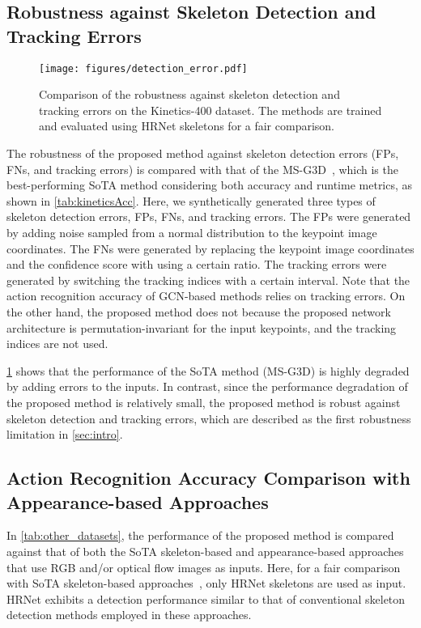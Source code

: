 \documentclass[10pt,twocolumn,letterpaper]{article}
\begin{document}
\subsection{Robustness against Skeleton Detection and Tracking Errors}
\begin{figure}[tb]
  \centering
  \texttt{[image: figures/detection\_error.pdf]}
  \caption{Comparison of the robustness against skeleton detection and tracking errors on the Kinetics-400 dataset. The methods are trained and evaluated using HRNet skeletons for a fair comparison.}
  \label{fig:detection_error}
\end{figure}

The robustness of the proposed method against skeleton detection errors (FPs, FNs, and tracking errors) is compared with that of the MS-G3D~\cite{Liu2020CVPR}, which is the best-performing SoTA method considering both accuracy and runtime metrics, as shown in \cref{tab:kineticsAcc}.
Here, we synthetically generated three types of skeleton detection errors, FPs, FNs, and tracking errors.
The FPs were generated by adding noise sampled from a normal distribution to the keypoint image coordinates.
The FNs were generated by replacing the keypoint image coordinates and the confidence score with  using a certain ratio.
The tracking errors were generated by switching the tracking indices with a certain interval.
Note that the action recognition accuracy of GCN-based methods relies on tracking errors.
On the other hand, the proposed method does not because the proposed network architecture is permutation-invariant for the input keypoints, and the tracking indices are not used.

\cref{fig:detection_error} shows that the performance of the SoTA method (MS-G3D) is highly degraded by adding errors to the inputs.
In contrast, since the performance degradation of the proposed method is relatively small, the proposed method is robust against skeleton detection and tracking errors, which are described as the first robustness limitation in \cref{sec:intro}.

\subsection{Action Recognition Accuracy Comparison with Appearance-based Approaches}

In \cref{tab:other_datasets}, the performance of the proposed method is compared against that of both the SoTA skeleton-based and appearance-based approaches that use RGB and/or optical flow images as inputs.
Here, for a fair comparison with SoTA skeleton-based approaches~\cite{Su2020ECCV,Moon2021CVPR,Duan2022CVPR}, only HRNet skeletons are used as input.
HRNet exhibits a detection performance similar to that of conventional skeleton detection methods employed in these approaches.
\end{document}
